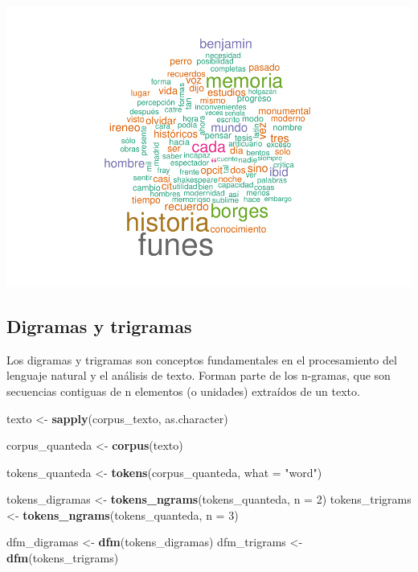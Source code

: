 \documentclass[
]{article}
\newenvironment{Shaded}{\begin{snugshade}}{\end{snugshade}}
\newcommand{\AttributeTok}[1]{\textcolor[rgb]{0.13,0.29,0.53}{#1}}
\newcommand{\DecValTok}[1]{\textcolor[rgb]{0.00,0.00,0.81}{#1}}
\newcommand{\FunctionTok}[1]{\textcolor[rgb]{0.13,0.29,0.53}{\textbf{#1}}}
\newcommand{\NormalTok}[1]{#1}
\newcommand{\OtherTok}[1]{\textcolor[rgb]{0.56,0.35,0.01}{#1}}
\newcommand{\StringTok}[1]{\textcolor[rgb]{0.31,0.60,0.02}{#1}}
\begin{document}
\includegraphics{Mineria_de_Texto_files/figure-latex/unnamed-chunk-24-1.pdf}

\hypertarget{digramas-y-trigramas}{%
\subsection{Digramas y trigramas}\label{digramas-y-trigramas}}

Los digramas y trigramas son conceptos fundamentales en el procesamiento
del lenguaje natural y el análisis de texto. Forman parte de los
n-gramas, que son secuencias contiguas de n elementos (o unidades)
extraídos de un texto.

\begin{Shaded}
\begin{Highlighting}[]
\NormalTok{texto }\OtherTok{\textless{}{-}} \FunctionTok{sapply}\NormalTok{(corpus\_texto, as.character)}

\NormalTok{corpus\_quanteda }\OtherTok{\textless{}{-}} \FunctionTok{corpus}\NormalTok{(texto)}

\NormalTok{tokens\_quanteda }\OtherTok{\textless{}{-}} \FunctionTok{tokens}\NormalTok{(corpus\_quanteda, }\AttributeTok{what =} \StringTok{"word"}\NormalTok{)}

\NormalTok{tokens\_digramas }\OtherTok{\textless{}{-}} \FunctionTok{tokens\_ngrams}\NormalTok{(tokens\_quanteda, }\AttributeTok{n =} \DecValTok{2}\NormalTok{)}
\NormalTok{tokens\_trigrams }\OtherTok{\textless{}{-}} \FunctionTok{tokens\_ngrams}\NormalTok{(tokens\_quanteda, }\AttributeTok{n =} \DecValTok{3}\NormalTok{)}

\NormalTok{dfm\_digramas }\OtherTok{\textless{}{-}} \FunctionTok{dfm}\NormalTok{(tokens\_digramas)}
\NormalTok{dfm\_trigrams }\OtherTok{\textless{}{-}} \FunctionTok{dfm}\NormalTok{(tokens\_trigrams)}
\end{Highlighting}
\end{Shaded}
\end{document}

